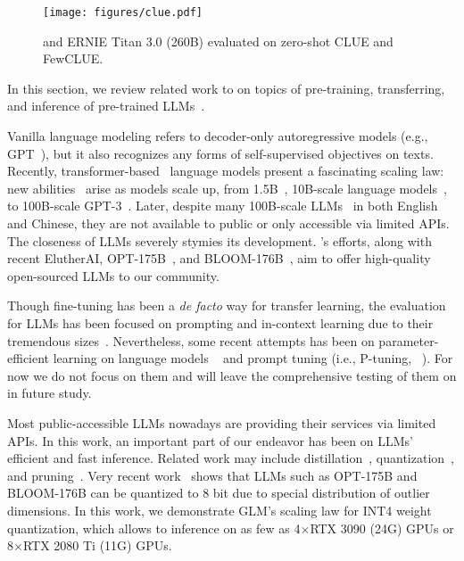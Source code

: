 {\begin{figure}[t]
    \centering
    \texttt{[image: figures/clue.pdf]}
    \vspace{-6mm}
    \caption{\glm and ERNIE Titan 3.0 (260B) evaluated on zero-shot CLUE and FewCLUE.}
    \label{fig:clue}
    \vspace{-6mm}
\end{figure}

}%
In this section, we review related work to \glm on topics of pre-training, transferring, and inference of pre-trained LLMs~\citep{qiu2020pre,bommasani2021opportunities}.

Vanilla language modeling refers to decoder-only autoregressive models (e.g., GPT~\citep{radford2018improving}), but it also recognizes any forms of self-supervised objectives on texts. %
Recently, transformer-based~\citep{vaswani2017attention} language models present a fascinating scaling law: new abilities~\citep{wei2022emergent} arise as models scale up, from 1.5B~\citep{radford2019language}, 10B-scale language models~\citep{raffel2020exploring,shoeybi2019megatron,black2022gpt}, to 100B-scale GPT-3~\citep{brown2020language}.
Later, despite many 100B-scale LLMs~\citep{lieber2021jurassic,thoppilan2022lamda,rae2021scaling,smith2022using,chowdhery2022palm,wu2021yuan,zeng2021pangu,wang2021ernie} in both English and Chinese, they are not available to public or only accessible via limited APIs.
The closeness of LLMs severely stymies its development.
\glm's efforts, along with recent ElutherAI, OPT-175B~\citep{zhang2022opt}, and BLOOM-176B~\citep{scao2022what}, aim to offer high-quality open-sourced LLMs to our community.

Though fine-tuning has been a \textit{de facto} way for transfer learning, the evaluation for LLMs has been focused on prompting and in-context learning due to their tremendous sizes~\citep{brown2020language,liu2021pre}.
Nevertheless, some recent attempts has been on parameter-efficient learning on language models
~\citep{houlsby2019parameter} and prompt tuning (i.e., P-tuning, ~\cite{li2021prefix,liu2021gpt,lester2021power,liu2022p}). %
For now we do not focus on them and will leave the comprehensive testing of them on \glm in future study.

Most public-accessible LLMs nowadays are providing their services via limited APIs.%
In this work, an important part of our endeavor has been on LLMs' efficient and fast inference.
Related work may include distillation~\citep{sanh2019distilbert,jiao2020tinybert,wang2020minilm}, quantization~\citep{zafrir2019q8bert,shen2020q,tao2022compression}, and pruning~\citep{michel2019sixteen,fan2019reducing}.
Very recent work~\citep{dettmers2022llm} shows that LLMs such as OPT-175B and BLOOM-176B can be quantized to 8 bit due to special distribution of outlier dimensions.
In this work, we demonstrate GLM's scaling law for INT4 weight quantization, which allows \glm to inference on as few as 4$\times$RTX 3090 (24G) GPUs or 8$\times$RTX 2080 Ti (11G) GPUs.

